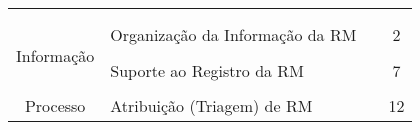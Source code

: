 \begin{table}[htbp]
{\begin{tabular}{|c|l|l|c|}
                              &                                                  & \cite{Sasso2014}                               &                      \\
                              &                                                  & \cite{takama2013application}                   &                      \\ \hline
\multirow{9}{*}{Informação}   & \multirow{2}{*}{Organização da Informação da RM} & \cite{mani2012ausum}                           & \multirow{2}{*}{2}   \\
                              &                                                  & \cite{Otoom2016}                               &                      \\ \cline{2-4} 
                              & \multirow{7}{*}{Suporte ao Registro da RM}       & \cite{Bettenburg2008a}                         & \multirow{7}{*}{7}   \\
                              &                                                  & \cite{Correa2013b}                             &                      \\
                              &                                                  & \cite{moran2015auto}                           &                      \\
                              &                                                  & \cite{Moran:2015:EAA:2786805.2807557}          &                      \\
                              &                                                  & \cite{Tu:2014:MQI:2677832.2677844}             &                      \\
                              &                                                  & \cite{White:2015:GRR:2820282.2820291}          &                      \\
                              &                                                  & \cite{Wu2011a}                                 &                      \\ \hline
\multirow{40}{*}{Processo}    & \multirow{12}{*}{Atribuição (Triagem) de RM}     & \cite{Banitaan2013}                            & \multirow{12}{*}{12} \\
                              &                                                  & \cite{hosseini2012market}                      &                      \\
                              &                                                  & \cite{Hu:2014:EBT:2707683.2708297}             &                      \\

\end{tabular}}
\end{table}
